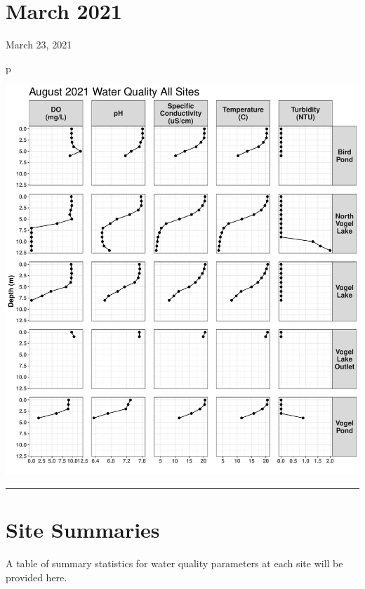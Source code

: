 \documentclass[
]{book}
\newenvironment{Shaded}{\begin{snugshade}}{\end{snugshade}}
\newcommand{\NormalTok}[1]{#1}
\begin{document}
\hypertarget{march-2021}{%
\section{March 2021}\label{march-2021}}

March 23, 2021

\begin{Shaded}
\begin{Highlighting}[]
\NormalTok{p}
\end{Highlighting}
\end{Shaded}

\includegraphics{Miller_Creek_Vogel_Lake_Water_Quality_files/figure-latex/unnamed-chunk-8-1.pdf}

\begin{center}\rule{0.5\linewidth}{0.5pt}\end{center}

\hypertarget{site-summaries}{%
\section{Site Summaries}\label{site-summaries}}

A table of summary statistics for water quality parameters at each site will be provided here.
\end{document}
